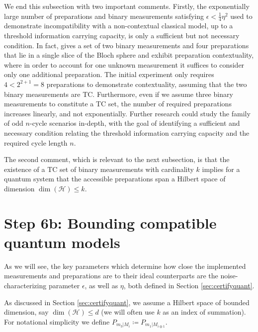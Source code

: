 We end this subsection with two important comments. Firstly, the exponentially large number of preparations and binary measurements satisfying $\epsilon<\frac{1}{4}\eta^2$ used to demonstrate incompatibility with a non-contextual classical model, up to a threshold information carrying capacity, is only a sufficient but not necessary condition. In fact, \cite{Pusey2019a} gives a set of two binary measurements and four preparations that lie in a single slice of the Bloch sphere and exhibit preparation contextuality, where in order to account for one unknown measurement it suffices to consider only one additional preparation. The initial experiment only requires $4<2^{2+1}=8$ preparations to demonstrate contextuality, assuming that the two binary measurements are TC. Furthermore, even if we assume three binary measurements to constitute a TC set, the number of required preparations increases linearly, and not exponentially. Further research could study the family of odd $n$-cycle scenarios in-depth, with the goal of identifying a sufficient and necessary condition relating the threshold information carrying capacity and the required cycle length $n$.

The second comment, which is relevant to the next subsection, is that the existence of a TC set of binary measurements with cardinality $k$ implies for a quantum system that the accessible preparations span a Hilbert space of dimension $\operatorname{dim}(\mathcal{H})\leq k$.

\section{Step 6b: Bounding compatible quantum models}
\label{sec:boundingmodels}

As we will see, the key parameters which determine how close the implemented measurements and preparations are to their ideal counterparts are the noise-characterizing parameter $\epsilon$, as well as $\eta$, both defined in Section \ref{sec:certifyquant}.
  
As discussed in Section \ref{sec:certifyquant}, we assume a Hilbert space of bounded dimension, say $\operatorname{dim}(\mathcal{H})\leq d$ (we will often use $k$ as an index of summation). For notational simplicity we define $P_{m_3\vert M_i}\coloneqq P_{m_1\vert M_{i\oplus 1}}$.

